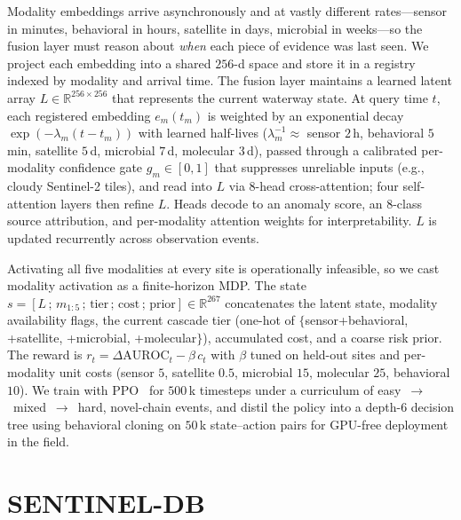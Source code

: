 \documentclass{article}
\begin{document}
Modality embeddings arrive asynchronously and at vastly different rates---sensor in minutes, behavioral in hours, satellite in days, microbial in weeks---so the fusion layer must reason about \emph{when} each piece of evidence was last seen. We project each embedding into a shared $256$-d space and store it in a registry indexed by modality and arrival time. The fusion layer maintains a learned latent array $L\!\in\!\mathbb{R}^{256\times 256}$ that represents the current waterway state. At query time $t$, each registered embedding $e_m(t_m)$ is weighted by an exponential decay $\exp(-\lambda_m(t-t_m))$ with learned half-lives ($\lambda_m^{-1}\!\approx$ sensor $2$\,h, behavioral $5$\,min, satellite $5$\,d, microbial $7$\,d, molecular $3$\,d), passed through a calibrated per-modality confidence gate $g_m\!\in\![0,1]$ that suppresses unreliable inputs (e.g., cloudy Sentinel-2 tiles), and read into $L$ via $8$-head cross-attention; four self-attention layers then refine $L$. Heads decode to an anomaly score, an 8-class source attribution, and per-modality attention weights for interpretability. $L$ is updated recurrently across observation events.

Activating all five modalities at every site is operationally infeasible, so we cast modality activation as a finite-horizon MDP. The state $s\!=\![L\,;\,m_{1{:}5}\,;\,\text{tier}\,;\,\text{cost}\,;\,\text{prior}]\!\in\!\mathbb{R}^{267}$ concatenates the latent state, modality availability flags, the current cascade tier (one-hot of $\{$sensor+behavioral, +satellite, +microbial, +molecular$\}$), accumulated cost, and a coarse risk prior. The reward is $r_t = \Delta\mathrm{AUROC}_t - \beta\,c_t$ with $\beta$ tuned on held-out sites and per-modality unit costs (sensor $5$, satellite $0.5$, microbial $15$, molecular $25$, behavioral $10$). We train with PPO~\citep{schulman2017ppo} for $500$\,k timesteps under a curriculum of easy~$\rightarrow$~mixed~$\rightarrow$~hard, novel-chain events, and distil the policy into a depth-$6$ decision tree using behavioral cloning on $50$\,k state--action pairs for GPU-free deployment in the field.

\section{SENTINEL-DB}
\label{sec:db}
\end{document}
